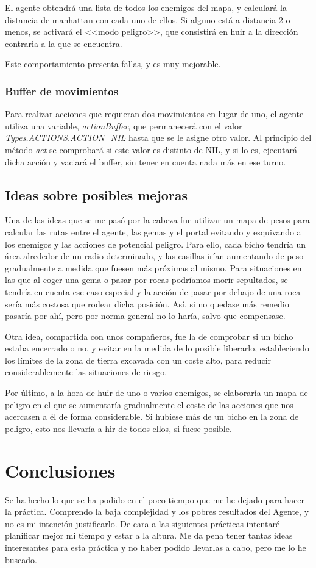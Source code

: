 \documentclass[11pt,a4paper]{article}
\begin{document}
El agente obtendrá una lista de todos los enemigos del mapa, y calculará la distancia de manhattan con cada uno de ellos.
Si alguno está a distancia 2 o menos, se activará el <<modo peligro>>, que consistirá en huir a la dirección contraria a la que se encuentra.

Este comportamiento presenta fallas, y es muy mejorable.

\subsubsection{Buffer de movimientos}
Para realizar acciones que requieran dos movimientos en lugar de uno, el agente utiliza una variable, \textit{actionBuffer}, que permanecerá con el valor \textit{Types.ACTIONS.ACTION\_NIL} hasta que se le asigne otro valor. Al principio del método \textit{act} se comprobará si este valor es distinto de NIL, y si lo es, ejecutará dicha acción y vaciará el buffer, sin tener en cuenta nada más en ese turno.



\subsection{Ideas sobre posibles mejoras}
Una de las ideas que se me pasó por la cabeza fue utilizar un mapa de pesos para calcular las rutas entre el agente, las gemas y el portal evitando y esquivando a los enemigos y las acciones de potencial peligro. Para ello, cada bicho tendría un área alrededor de un radio determinado, y las casillas irían aumentando de peso gradualmente a medida que fuesen más próximas al mismo. Para situaciones en las que al coger una gema o pasar por rocas podríamos morir sepultados, se tendría en cuenta ese caso especial y la acción de pasar por debajo de una roca sería más costosa que rodear dicha posición. Así, si no quedase más remedio pasaría por ahí, pero por norma general no lo haría, salvo que compensase.

Otra idea, compartida con unos compañeros, fue la de comprobar si un bicho estaba encerrado o no, y evitar en la medida de lo posible liberarlo, estableciendo los límites de la zona de tierra excavada con un coste alto, para reducir considerablemente las situaciones de riesgo.

Por último, a la hora de huir de uno o varios enemigos, se elaboraría un mapa de peligro en el que se aumentaría gradualmente el coste de las acciones que nos acercasen a él de forma considerable. Si hubiese más de un bicho en la zona de peligro, esto nos llevaría a hir de todos ellos, si fuese posible.


\section{Conclusiones}
Se ha hecho lo que se ha podido en el poco tiempo que me he dejado para hacer la práctica. Comprendo la baja complejidad y los pobres resultados del Agente, y no es mi intención justificarlo. De cara a las siguientes prácticas intentaré planificar mejor mi tiempo y estar a la altura. Me da pena tener tantas ideas interesantes para esta práctica y no haber podido llevarlas a cabo, pero me lo he buscado.
\end{document}
